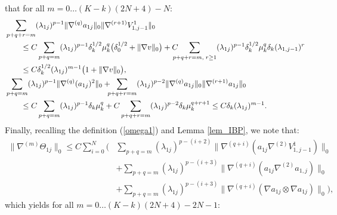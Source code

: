 \documentclass[reqno,twoside,11pt]{amsart}
\numberwithin{equation}{section}
\theoremstyle{plain}
\theoremstyle{definition}
\begin{document}
that for all $m=0\ldots (K-k)(2N+4)-N$:
\begin{equation*}
\begin{split}
& \sum_{p+q+r=m} (\lambda_{1j})^{p-1}\|\nabla^{(q)}a_{1j} \|_0\|\nabla^{(r+1)}V_{1, j-1}^1\|_0
\\ & \qquad \leq C \sum_{p+q=m}
(\lambda_{1j})^{p-1}\delta_k^{1/2}\mu_k^q\big(\delta_0^{1/2}+\|\nabla v\|_0\big)
+ C\hspace{-3mm} 
\sum_{p+q+r=m,\; r\geq 1}  (\lambda_{1j})^{p-1}\delta_k^{1/2}\mu_k^q\delta_k(\lambda_{1,j-1})^{r}
\\ & \qquad \leq C\delta_k^{1/2}(\lambda_{1j})^{m-1}\big(1+ \|\nabla v\|_0\big),\vspace{2mm}\\
& \sum_{p+q=m} (\lambda_{1j})^{p-1}\|\nabla^{(q)}(a_{1j})^2 \|_0
+ \hspace{-2mm} \sum_{p+q+r=m}
(\lambda_{1j})^{p-2}\|\nabla^{(q)}a_{1j} \|_0 \|\nabla^{(r+1)}a_{1j} \|_0 \\ & \qquad \leq 
C\sum_{p+q=m} (\lambda_{1j})^{p-1}\delta_k\mu_k^q 
+ C\sum_{p+q+r=m} (\lambda_{1j})^{p-2} \delta_k\mu_k^{q+r+1}\leq C
\delta_k(\lambda_{1j})^{m-1}.
\end{split}
\end{equation*}
Finally, recalling the definition (\ref{omega1}) and Lemma
\ref{lem_IBP}, we note that:
\begin{equation*}
\begin{split}
\|\nabla^{(m)}\Theta_{1j}\|_0\leq C\sum_{i=0}^N
\Big(& \sum_{p+q=m}(\lambda_{1j})^{p-(i+2)}\|\nabla^{(q+i)}(a_{1j} \nabla^{(2)}V_{1, j-1}^1)\|_0
\\ & + \sum_{p+q=m}(\lambda_{1j})^{p-(i+3)}\|\nabla^{(q+i)}(a_{1j} \nabla^{(2)}a_{1, j})\|_0
\\ & + \sum_{p+q=m}(\lambda_{1j})^{p-(i+3)}\|\nabla^{(q+i)}(\nabla a_{1j} \otimes \nabla a_{1j})\|_0\Big),
\end{split}
\end{equation*}
which yields for all $m=0\ldots (K-k)(2N+4)-2N-1$:
\end{document}
